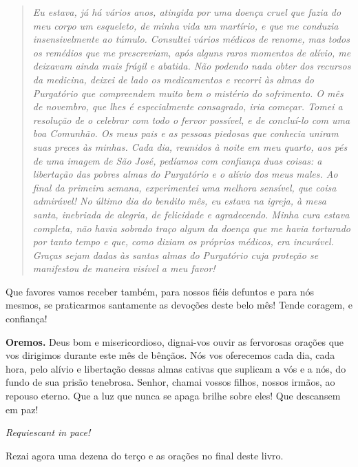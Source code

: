 \begin{quote}
\textit{\textit{Eu estava, já há vários anos, atingida por uma doença cruel que fazia do meu corpo um esqueleto, de minha vida um martírio, e que me conduzia insensivelmente ao túmulo. Consultei vários médicos de renome, mas todos os remédios que me prescreviam, após alguns raros momentos de alívio, me deixavam ainda mais frágil e abatida. Não podendo nada obter dos recursos da medicina, deixei de lado os medicamentos e recorri às almas do Purgatório que compreendem muito bem o mistério do sofrimento. O mês de novembro, que lhes é especialmente consagrado, iria começar. Tomei a resolução de o celebrar com todo o fervor possível, e de concluí-lo com uma boa Comunhão. Os meus pais e as pessoas piedosas que conhecia uniram suas preces às minhas. Cada dia, reunidos à noite em meu quarto, aos pés de uma imagem de São José, pedíamos com confiança duas coisas: a libertação das pobres almas do Purgatório e o alívio dos meus males. Ao final da primeira semana, experimentei uma melhora sensível, que coisa admirável! No último dia do bendito mês, eu estava na igreja, à mesa santa, inebriada de alegria, de felicidade e agradecendo. Minha cura estava completa, não havia sobrado traço algum da doença que me havia torturado por tanto tempo e que, como diziam os próprios médicos, era incurável. Graças sejam dadas às santas almas do Purgatório cuja proteção se manifestou de maneira visível a meu favor!}}
\end{quote}

Que favores vamos receber também, para nossos fiéis defuntos e para nós mesmos, se praticarmos santamente as devoções deste belo mês! Tende coragem, e confiança!

\vspace{\baselineskip}\noindent \textbf{Oremos.} Deus bom e misericordioso, dignai-vos ouvir as fervorosas orações que vos dirigimos durante este mês de bênçãos. Nós vos oferecemos cada dia, cada hora, pelo alívio e libertação dessas almas cativas que suplicam a vós e a nós, do fundo de sua prisão tenebrosa. Senhor, chamai vossos filhos, nossos irmãos, ao repouso eterno. Que a luz que nunca se apaga brilhe sobre eles! Que descansem em paz!


\begin{center}
\textit{Requiescant in pace!}
\end{center}

Rezai agora uma dezena do terço e as orações no final deste livro.
